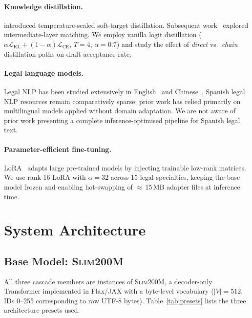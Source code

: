 \documentclass[11pt,a4paper]{article}
\begin{document}
\paragraph{Knowledge distillation.}
\citet{hinton2015distilling} introduced temperature-scaled soft-target
distillation. Subsequent work~\citep{romero2015fitnets,jiao2019tinybert} explored
intermediate-layer matching. We employ vanilla logit distillation
($\alpha\mathcal{L}_{\mathrm{KL}} + (1-\alpha)\mathcal{L}_{\mathrm{CE}}$,
$T=4$, $\alpha=0.7$) and study the effect of \emph{direct} vs.\ \emph{chain}
distillation paths on draft acceptance rate.

\paragraph{Legal language models.}
Legal NLP has been studied extensively in
English~\citep{zheng2021does,chalkidis2020legal} and
Chinese~\citep{cui2023chatlaw}. Spanish legal NLP resources remain
comparatively sparse; prior work has relied primarily on multilingual models
applied without domain adaptation. We are not aware of prior work presenting a
complete inference-optimised pipeline for Spanish legal text.

\paragraph{Parameter-efficient fine-tuning.}
LoRA~\citep{hu2022lora} adapts large pre-trained models by injecting trainable
low-rank matrices. We use rank-16 LoRA with $\alpha=32$ across 15 legal
specialties, keeping the base model frozen and enabling hot-swapping of
$\approx$\,15\,MB adapter files at inference time.

\section{System Architecture}
\label{sec:arch}

\subsection{Base Model: \textsc{Slim200M}}

All three cascade members are instances of \textsc{Slim200M}, a decoder-only
Transformer implemented in Flax/JAX with a byte-level vocabulary ($|V|=512$,
IDs 0--255 corresponding to raw UTF-8 bytes). Table~\ref{tab:presets} lists the
three architecture presets used.
\end{document}
